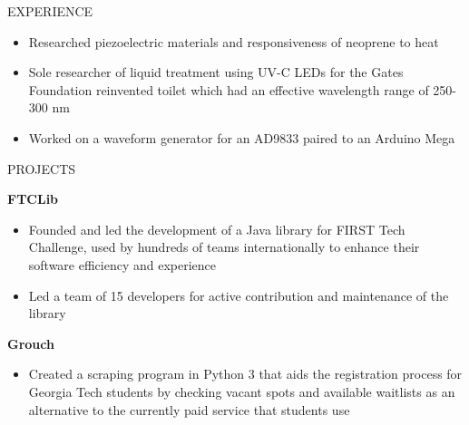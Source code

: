 \documentclass{resume} %
\begin{document}
\begin{rSection}{EXPERIENCE}
\vspace{-0.5em}
 \begin{itemize}
    \itemsep -5pt {} 
     \item Researched piezoelectric materials and responsiveness of neoprene to heat
     \item Sole researcher of liquid treatment using UV-C LEDs for the Gates Foundation
     reinvented toilet which had an effective wavelength range of 250-300 nm
     \item Worked on a waveform generator for an AD9833 paired to an Arduino Mega
 \end{itemize}
\end{rSection} 

\vspace{-0.8em}
\begin{rSection}{PROJECTS}
\vspace{-1.25em}
\item \textbf{FTCLib}
\vspace{-0.5em}
 \begin{itemize}
    \itemsep -5pt {} 
     \item Founded and led the development of a Java library for FIRST Tech Challenge, used by hundreds of teams internationally
     to enhance their software efficiency and experience
     \item Led a team of 15 developers for active contribution and maintenance of the library
 \end{itemize}
\vspace{-0.5em}
\item \textbf{Grouch}
\vspace{-0.5em}
 \begin{itemize}
    \itemsep -5pt {}
    \item Created a scraping program in Python 3 that aids the registration process for Georgia Tech students by
    checking vacant spots and available waitlists as an alternative to the currently paid service
    that students use
 \end{itemize}
\end{rSection}
\end{document}
